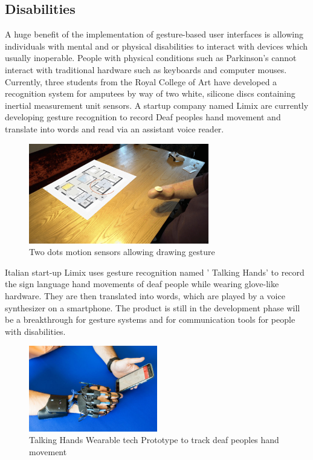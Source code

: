 \subsection{Disabilities}
A huge benefit of the implementation of gesture-based user interfaces is allowing individuals with mental and or physical disabilities to interact with devices which usually inoperable. People with physical conditions such as Parkinson's cannot interact with traditional hardware such as keyboards and computer mouses. Currently, three students from the Royal College of Art have developed a recognition system for amputees by way of two white, silicone discs containing inertial measurement unit sensors. A startup company named Limix are currently developing gesture recognition to record Deaf peoples hand movement and translate into words and read via an assistant voice reader.

 \begin{figure}[h!]
  \centering
    \includegraphics[width=0.7\textwidth]{Research-Latex/images/PeopleWithDisabilities.png}
     \caption{Two dots motion sensors allowing drawing gesture}
\end{figure}
 


Italian start-up Limix uses gesture recognition named ' Talking Hands' to record the sign language hand movements of deaf people while wearing glove-like hardware. They are then translated into words, which are played by a voice synthesizer on a smartphone. The product is still in the development phase will be a breakthrough for gesture systems and for communication tools for people with disabilities.




   \begin{figure}[h!]
  \centering
    \includegraphics[width=0.5\textwidth]{Research-Latex/images/talkingHandsPrototype.jpg}
     \caption{Talking Hands Wearable tech Prototype to track deaf peoples hand movement}
\end{figure}
 